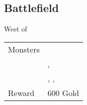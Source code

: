 \subsection{Battlefield}
\label{map:battlefield_09}

West of 

\begin{longtable}{ l p{9cm} }
	Monsters
	& \nameref{monster:desert_hag} \\
	& \nameref{monster:desert_hag}, \nameref{monster:desert_hag} \\
	& \nameref{monster:desert_hag}, \nameref{monster:desert_hag}, \nameref{monster:desert_hag}
\\
	Reward & 600 Gold
\end{longtable}
